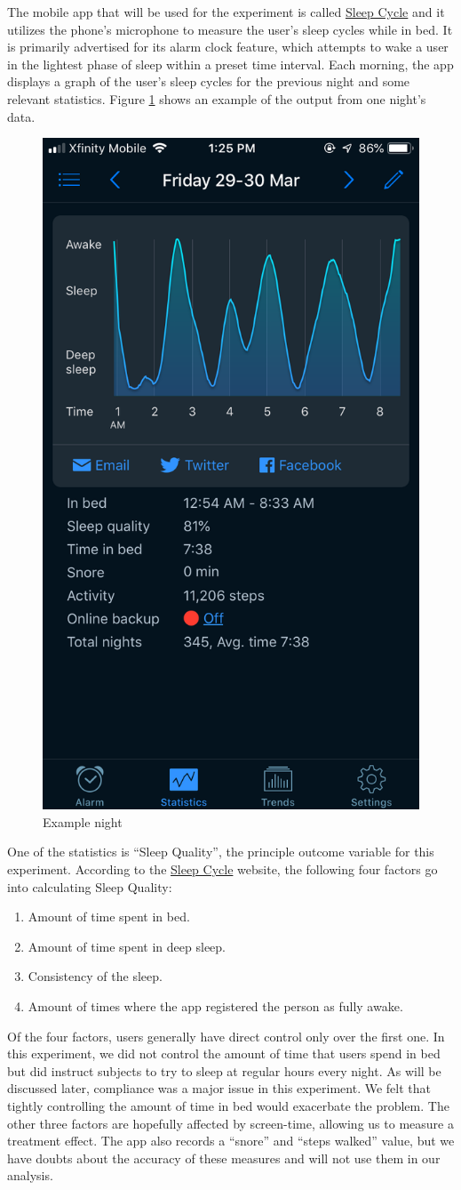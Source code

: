 \documentclass[12pt,]{article}
\providecommand{\tightlist}{%
  \setlength{\itemsep}{0pt}\setlength{\parskip}{0pt}}
\begin{document}
The mobile app that will be used for the experiment is called
\href{www.sleepcycle.com}{Sleep Cycle} and it utilizes the phone's
microphone to measure the user's sleep cycles while in bed. It is
primarily advertised for its alarm clock feature, which attempts to wake
a user in the lightest phase of sleep within a preset time interval.
Each morning, the app displays a graph of the user's sleep cycles for
the previous night and some relevant statistics. Figure
\ref{fig:example_night} shows an example of the output from one night's
data.

\begin{figure}[H]

{\centering \includegraphics[width=0.25\linewidth]{img/example_night} 

}

\caption{Example night}\label{fig:example_night}
\end{figure}

One of the statistics is ``Sleep Quality'', the principle outcome
variable for this experiment. According to the
\href{www.sleepcycle.com}{Sleep Cycle} website, the following four
factors go into calculating Sleep Quality:

\begin{enumerate}
\def\labelenumi{\arabic{enumi}.}
\tightlist
\item
  Amount of time spent in bed.
\item
  Amount of time spent in deep sleep.
\item
  Consistency of the sleep.
\item
  Amount of times where the app registered the person as fully awake.
\end{enumerate}

Of the four factors, users generally have direct control only over the
first one. In this experiment, we did not control the amount of time
that users spend in bed but did instruct subjects to try to sleep at
regular hours every night. As will be discussed later, compliance was a
major issue in this experiment. We felt that tightly controlling the
amount of time in bed would exacerbate the problem. The other three
factors are hopefully affected by screen-time, allowing us to measure a
treatment effect. The app also records a ``snore'' and ``steps walked''
value, but we have doubts about the accuracy of these measures and will
not use them in our analysis.
\end{document}
